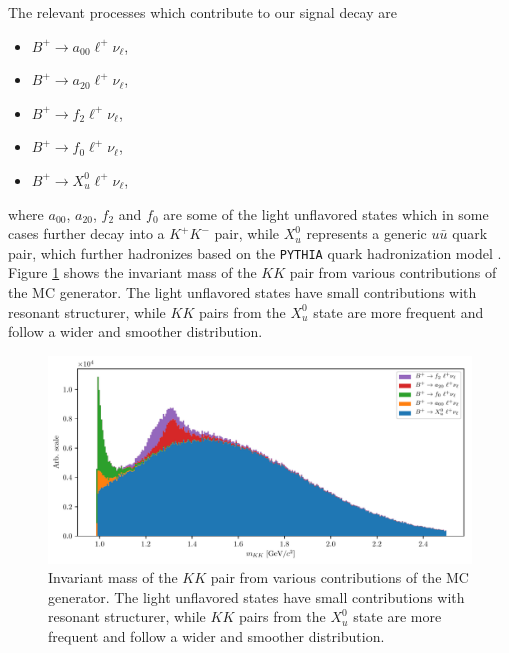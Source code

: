 \documentclass[headings=standardclasses,headings=big,oneside,a4paper,openany,12pt]{scrbook}
\begin{document}
The relevant processes which contribute to our signal decay are
\begin{itemize}
\item $B^+ \to a_{00} \ell^+ \nu_\ell$,
\item $B^+ \to a_{20} \ell^+ \nu_\ell$,
\item $B^+ \to f_{2} \ell^+ \nu_\ell$,
\item $B^+ \to f_{0} \ell^+ \nu_\ell$,
\item $B^+ \to X_{u}^0 \ell^+ \nu_\ell$,
\end{itemize}
where $a_{00}$, $a_{20}$, $f_{2}$ and $f_{0}$ are some of the light unflavored states which in some cases further decay into a $K^+K^-$ pair, while $X_u^0$ represents a generic $u \bar u$ quark pair, which further hadronizes based on the \texttt{PYTHIA} quark hadronization model \cite{sjostrand2006pythia}. %
Figure \ref{fig:KKsrc} shows the invariant mass of the $KK$ pair from various contributions of the MC generator. The light unflavored states have small contributions with resonant structurer, while $KK$ pairs from the $X_u^0$ state are more frequent and follow a wider and smoother distribution.

\begin{figure}[H]
\centering
\includegraphics[width=\linewidth]{fig/KKlnu_src}
\captionsetup{width=.8\linewidth}
\caption{Invariant mass of the $KK$ pair from various contributions of the MC generator. The light unflavored states have small contributions with resonant structurer, while $KK$ pairs from the $X_u^0$ state are more frequent and follow a wider and smoother distribution.}
\label{fig:KKsrc}
\end{figure}
\end{document}
